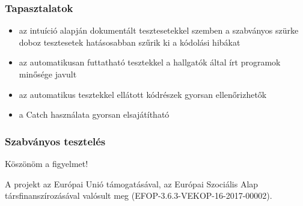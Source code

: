 \documentclass[11pt]{beamer}
\begin{document}
\begin{frame}
	\frametitle{Tapasztalatok}
	\begin{itemize}
		\item az intuíció alapján dokumentált tesztesetekkel szemben a szabványos szürke doboz tesztesetek hatásosabban szűrik ki a kódolási hibákat\vspace*{3px}
		\item az automatikusan futtatható tesztekkel a hallgatók által írt programok minősége javult\vspace*{3px}
		\item az automatikus tesztekkel ellátott kódrészek gyorsan ellenőrizhetők\vspace*{3px}
		\item a Catch használata gyorsan elsajátítható
	\end{itemize}
\end{frame}

\begin{frame}
	\frametitle{Szabványos tesztelés}
	\begin{center}
		\Large{Köszönöm a figyelmet!}
	
	\vspace*{25px}
	{\small A projekt az Európai Unió támogatásával, az Európai Szociális Alap társfinanszírozásával valósult meg (EFOP-3.6.3-VEKOP-16-2017-00002).}\end{center}
\end{frame}
\end{document}
